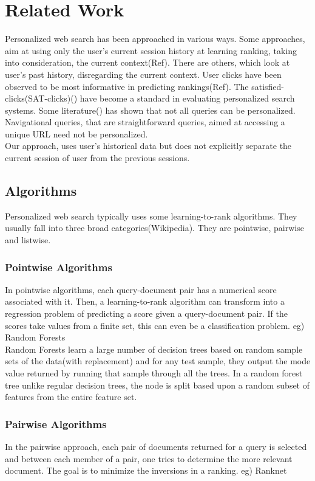 \documentclass[11pt,letterpaper]{article}
\begin{document}
\section{Related Work}
Personalized web search has been approached in various ways. Some approaches, aim at using only the user's current session history at learning ranking, taking into consideration, the current context(Ref). There are others, which look at user's past history, disregarding the current context. User clicks have been observed to be most informative in predicting rankings(Ref). The satisfied-clicks(SAT-clicks)() have become a standard in evaluating personalized search systems. Some literature() has shown that not all queries can be personalized. Navigational queries, that are straightforward queries, aimed at accessing a unique URL need not be personalized. \\
Our approach, uses user's historical data but does not explicitly separate the current session of user from the previous sessions. %
\subsection{Algorithms}
Personalized web search typically uses some learning-to-rank algorithms. They usually 
fall into three broad categories(Wikipedia). They are pointwise, pairwise and listwise. 
\subsubsection{Pointwise Algorithms}
In pointwise algorithms, each query-document pair has a numerical score associated with it. Then, a learning-to-rank algorithm can transform into a regression problem of predicting a score given a query-document pair. If the scores take values from a finite set, this can even be a classification problem. eg) Random Forests\\
Random Forests learn a large number of decision trees based on random sample sets of the data(with replacement) and for any test sample, they output the mode value returned by running that sample through all the trees. In a random forest tree unlike regular decision trees, the node is split based upon a random subset of features from the entire feature set. 
\subsubsection{Pairwise Algorithms}
In the pairwise approach, each pair of documents returned for a query is selected and between each member of a pair, one tries to determine the more relevant document. The goal is to minimize the inversions in a ranking.%
eg) Ranknet\\
\end{document}
